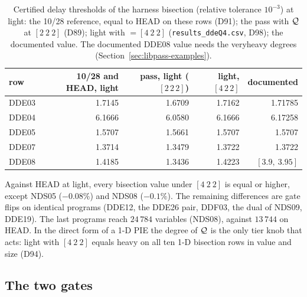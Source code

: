 \begin{table}[h]\centering\footnotesize
\setlength{\tabcolsep}{5pt}
\begin{tabular}{lrrrr}
\toprule
row & 10/28 and HEAD, light & pass, light ($[2\,2\,2]$) & light, $[4\,2\,2]$ & documented \\
\midrule
DDE03 & 1.7145 & 1.6709 & 1.7162 & 1.71785 \\
DDE04 & 6.1666 & 6.0580 & 6.1666 & 6.17258 \\
DDE05 & 1.5707 & 1.5661 & 1.5707 & 1.5707 \\
DDE07 & 1.3714 & 1.3479 & 1.3722 & 1.3722 \\
DDE08 & 1.4185 & 1.3436 & 1.4223 & $[3.9,\ 3.95]$ \\
\bottomrule
\end{tabular}
\caption{Certified delay thresholds of the harness bisection (relative tolerance $10^{-3}$) at light: the 10/28 reference, equal to HEAD on these rows (D91); the pass with $\mathcal{Q}$ at $[2\ 2\ 2]$ (D89); light with  $=[4\ 2\ 2]$ (\texttt{results\_ddeQ4.csv}, D98); the documented value. The documented DDE08 value needs the veryheavy degrees (Section~\ref{sec:libpass-examples}).}\label{tab:libpass-dde}
\end{table}

Against HEAD at light, every bisection value under $[4\ 2\ 2]$ is equal or higher, except NDS05 ($-0.08\%$) and NDS08 ($-0.1\%$). The remaining differences are gate flips on identical programs (DDE12, the DDE26 pair, DDF03, the dual of NDS09, DDE19). The last programs reach $24\,784$ variables (NDS08), against $13\,744$ on HEAD. In the direct form of a 1-D PIE the degree of $\mathcal{Q}$ is the only tier knob that acts: light with $[4\ 2\ 2]$ equals heavy on all ten 1-D bisection rows in value and size (D94).

\subsection{The two gates}\label{sec:libpass-gates}

